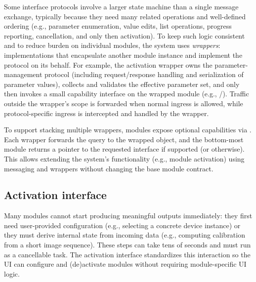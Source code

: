 Some interface protocols involve a larger state machine than a single message exchange, typically because they need many related operations and well-defined ordering (e.g., parameter enumeration, value edits, list operations, progress reporting, cancellation, and only then activation). To keep such logic consistent and to reduce burden on individual modules, the system uses \emph{wrappers}:  implementations that encapsulate another module instance and implement the protocol on its behalf. For example, the activation wrapper owns the parameter-management protocol (including request/response handling and serialization of parameter values), collects and validates the effective parameter set, and only then invokes a small capability interface on the wrapped module (e.g., /). Traffic outside the wrapper's scope is forwarded when normal ingress is allowed, while protocol-specific ingress is intercepted and handled by the wrapper.

To support stacking multiple wrappers, modules expose optional capabilities via . Each wrapper forwards the query to the wrapped object, and the bottom-most module returns a pointer to the requested interface if supported (or  otherwise). This allows extending the system's functionality (e.g., module activation) using messaging and wrappers without changing the base module contract.



\subsection{Activation interface} \label{subsec:ch3_activation_interface}

Many modules cannot start producing meaningful outputs immediately: they first need user-provided configuration (e.g., selecting a concrete device instance) or they must derive internal state from incoming data (e.g., computing calibration from a short image sequence). These steps can take tens of seconds and must run as a cancellable task. The activation interface standardizes this interaction so the UI can configure and (de)activate modules without requiring module-specific UI logic.

